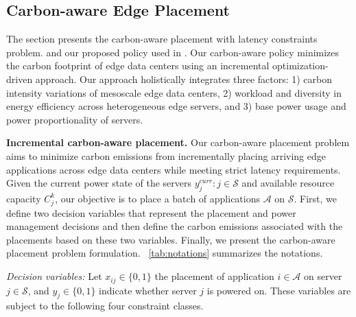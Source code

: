 \subsection{Carbon-aware Edge Placement}
\label{sec:design_problem}

The section presents the carbon-aware placement with latency constraints problem.  and our proposed policy used in \proposedsystem. Our carbon-aware policy minimizes the carbon footprint of edge data centers using an incremental optimization-driven approach. Our approach holistically integrates three factors: 1) carbon intensity variations of mesoscale edge data centers, 2) workload and diversity in energy efficiency across heterogeneous edge servers, and 3) base power usage and power proportionality of servers.




\noindent \textbf{Incremental carbon-aware placement.} Our carbon-aware placement problem aims to minimize carbon emissions from incrementally placing arriving edge applications across edge data centers while meeting strict latency requirements. Given the current power state of the servers $y_j^{curr}: j\in \mathcal{S}$ and available resource capacity $C_j^k$, our objective is to place a batch of applications $\mathcal{A}$ on $\mathcal{S}$.
First, we define two decision variables that represent the placement and power management decisions and then define the carbon emissions associated with the placements based on these two variables. Finally, we present the carbon-aware placement problem formulation. ~\autoref{tab:notations} summarizes the notations. 

\textit{Decision variables:} Let $x_{ij} \in \{0, 1\}$ the placement of application $i \in \mathcal{A}$ on server $j \in \mathcal{S}$, and $y_j \in \{0, 1\}$ indicate whether server $j$ is powered on. These variables are subject to the following four constraint classes.

